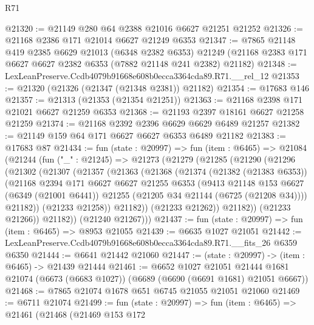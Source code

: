\begin{lexlean}{R71}
\begin{coremodule}
@21320 := @21149 @280 @64 @2388 @21016 @6627 @21251 @21252
@21326 := @21168 @2386 @171 @21014 @6627 @21249 @6353
@21347 := @7865
    @21148
    @419
    @2385
    @6629
    @21013
    (@6348 @2382 @6353)
    @21249
    (@21168 @2383 @171 @6627 @6627 @2382 @6353 (@7882 @21148 @241 @2382) @21182)
@21348 := LexLeanPreserve.Ccdb4079b91668e608b0ecca3364cda89.R71.__rel_12
@21353 := @21320 (@21326 (@21347 (@21348 @2381)) @21182)
@21354 := @17683 @146
@21357 := @21313 (@21353 (@21354 @21251))
@21363 := @21168 @2398 @171 @21021 @6627 @21259 @6353
@21368 := @21193 @2397 @18161 @6627 @21258 @21259
@21374 := @21168 @2392 @2396 @6629 @6629 @6489 @21257
@21382 := @21149 @159 @64 @171 @6627 @6627 @6353 @6489 @21182
@21383 := @17683 @87
@21434 := fun (state : @20997) =>
  fun (item : @6465) =>
  @21084
    (@21244
      (fun ("_" : @21245) =>
      @21273
        (@21279
          (@21285
            (@21290
              (@21296
                (@21302
                  (@21307
                    (@21357
                      (@21363
                        (@21368
                          (@21374
                            (@21382 (@21383 @6353))
                            (@21168
                              @2394
                              @171
                              @6627
                              @6627
                              @21255
                              @6353
                              (@9413
                                @21148
                                @153
                                @6627
                                (@6349 (@21001 @6441))
                                @21255
                                (@21205 @34 @21144 (@6725 (@21208 @34))))
                              @21182))
                          (@21233 @21258))
                        @21182))
                    (@21233 @21262))
                  @21182))
              (@21233 @21266))
            @21182))
        (@21240 @21267)))
@21437 := fun (state : @20997) => fun (item : @6465) => @8953 @21055
@21439 := @6635 @1027 @21051
@21442 := LexLeanPreserve.Ccdb4079b91668e608b0ecca3364cda89.R71.__fits_26 @6359 @6350
@21444 := @6641 @21442 @21060
@21447 := (state : @20997) -> (item : @6465) -> @21439 @21444
@21461 := @6652
    @1027
    @21051
    @21444
    @1681
    @21074
    (@6673 (@6683 @1027))
    (@6689 (@6690 (@6691 @1681) @21051 @6667))
@21468 := @7865 @21074 @1678 @651 @6745 @21055 @21051 @21060
@21469 := @6711 @21074
@21499 := fun (state : @20997) =>
  fun (item : @6465) =>
  @21461
    (@21468
      (@21469
        @153
        @172

\end{coremodule}
\end{lexlean}
